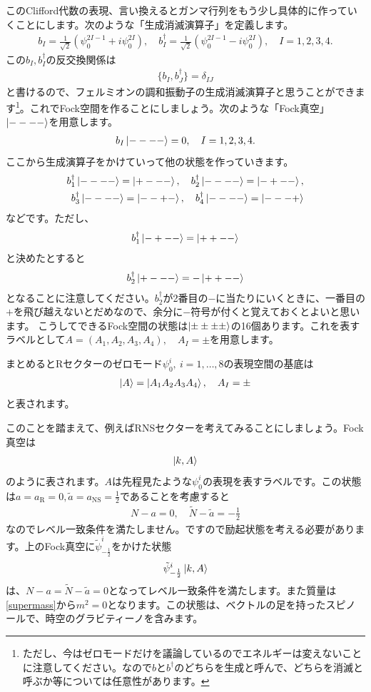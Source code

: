 \documentclass[report,paper=a4, fontsize=12pt, line_length=16cm, number_of_lines=34,dvipdfmx]{jlreq}
\numberwithin{equation}{chapter}
\numberwithin{equation}{section}
\newcommand{\Nt}{\widetilde{N}}
\newcommand{\at}{\tilde{a}}
\newcommand{\psit}{\tilde{\psi}}
\newcommand{\aNS}{a_{\mathrm{NS}}}
\newcommand{\aR}{a_{\mathrm{R}}}
\begin{document}
このClifford代数の表現、言い換えるとガンマ行列をもう少し具体的に作っていくことにします。次のような「生成消滅演算子」を定義します。
\begin{align}
  b_{I}=\frac{1}{\sqrt{2}}(\psi_{0}^{2I-1}+i\psi_{0}^{2I}),\quad
  b^{\dag}_{I}=\frac{1}{\sqrt{2}}(\psi_{0}^{2I-1}-i\psi_{0}^{2I})
  ,\quad I=1,2,3,4.
\end{align}
この$b_I,b^{\dag}_{I}$の反交換関係は
\begin{align}
  \{b_{I},b^{\dag}_{J}\}=\delta_{IJ}
\end{align}
と書けるので、フェルミオンの調和振動子の生成消滅演算子と思うことができます\footnote{ただし、今はゼロモードだけを議論しているのでエネルギーは変えないことに注意してください。なので$b$と$b^{\dag}$のどちらを生成と呼んで、どちらを消滅と呼ぶか等については任意性があります。}。これでFock空間を作ることにしましょう。次のような「Fock真空」$\ket{----}$を用意します。
\begin{align}
  b_{I}\ket{----}=0,\quad I=1,2,3,4.
\end{align}
ここから生成演算子をかけていって他の状態を作っていきます。
\begin{align}
  b^{\dag}_1\ket{----}=\ket{+---},\quad
  b^{\dag}_2\ket{----}=\ket{-+--},\nonumber\\
  b^{\dag}_3\ket{----}=\ket{--+-},\quad
  b^{\dag}_4\ket{----}=\ket{---+}
\end{align}
などです。ただし、
\begin{align}
  b^{\dag}_1\ket{-+--}=\ket{++--}
\end{align}
と決めたとすると
\begin{align}
  b^{\dag}_2\ket{+---}=-\ket{++--}
\end{align}
となることに注意してください。$b^{\dag}_{2}$が2番目の$-$に当たりにいくときに、一番目の$+$を飛び越えないとだめなので、余分に$-$符号が付くと覚えておくとよいと思います。
こうしてできるFock空間の状態は$\ket{\pm\pm\pm\pm}$の16個あります。これを表すラベルとして$A=(A_1,A_2,A_3,A_4),\quad A_{I}=\pm$を用意します。

まとめるとRセクターのゼロモード$\psi^{i}_{0},\ i=1,\dots,8$の表現空間の基底は
\begin{align}
  \ket{A}=\ket{A_1A_2A_3A_4},\quad A_I=\pm
\end{align}
と表されます。

このことを踏まえて、例えばRNSセクターを考えてみることにしましょう。Fock真空は
\begin{align}
  \ket{k,A}
\end{align}
のように表されます。$A$は先程見たような$\psi^{i}_{0}$の表現を表すラベルです。この状態は$a=\aR=0,\at=\aNS=\frac12$であることを考慮すると
\begin{align}
  N-a=0,\quad \Nt-\at=-\frac12
\end{align}
なのでレベル一致条件を満たしません。ですので励起状態を考える必要があります。上のFock真空に$\psit^{i}_{-\frac12}$をかけた状態
\begin{align}
  \psit^{i}_{-\frac12}\ket{k,A}
\end{align}
は、$N-a=\Nt-\at=0$となってレベル一致条件を満たします。また質量は\eqref{supermass}から$m^2=0$となります。この状態は、ベクトルの足を持ったスピノールで、時空のグラビティーノを含みます。
\end{document}

